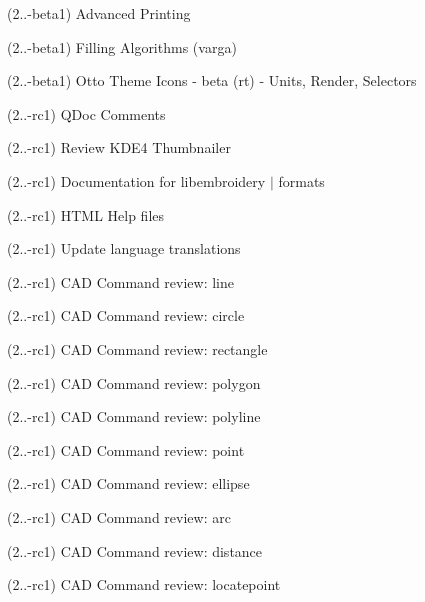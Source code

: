 \begin{DoxyRefList}
\label{todo__todo000248}%
%
(2..-\/beta1) Advanced Printing

\label{todo__todo000249}%
%
(2..-\/beta1) Filling Algorithms (varga)

\label{todo__todo000250}%
%
(2..-\/beta1) Otto Theme Icons -\/ beta (rt) -\/ Units, Render, Selectors

\label{todo__todo000251}%
%
(2..-\/rc1) QDoc Comments

\label{todo__todo000252}%
%
(2..-\/rc1) Review KDE4 Thumbnailer

\label{todo__todo000253}%
%
(2..-\/rc1) Documentation for libembroidery $|$ formats

\label{todo__todo000254}%
%
(2..-\/rc1) HTML Help files

\label{todo__todo000255}%
%
(2..-\/rc1) Update language translations

\label{todo__todo000256}%
%
(2..-\/rc1) CAD Command review\+: line

\label{todo__todo000257}%
%
(2..-\/rc1) CAD Command review\+: circle

\label{todo__todo000258}%
%
(2..-\/rc1) CAD Command review\+: rectangle

\label{todo__todo000259}%
%
(2..-\/rc1) CAD Command review\+: polygon

\label{todo__todo000260}%
%
(2..-\/rc1) CAD Command review\+: polyline

\label{todo__todo000261}%
%
(2..-\/rc1) CAD Command review\+: point

\label{todo__todo000262}%
%
(2..-\/rc1) CAD Command review\+: ellipse

\label{todo__todo000263}%
%
(2..-\/rc1) CAD Command review\+: arc

\label{todo__todo000264}%
%
(2..-\/rc1) CAD Command review\+: distance

\label{todo__todo000265}%
%
(2..-\/rc1) CAD Command review\+: locatepoint


\end{DoxyRefList}
